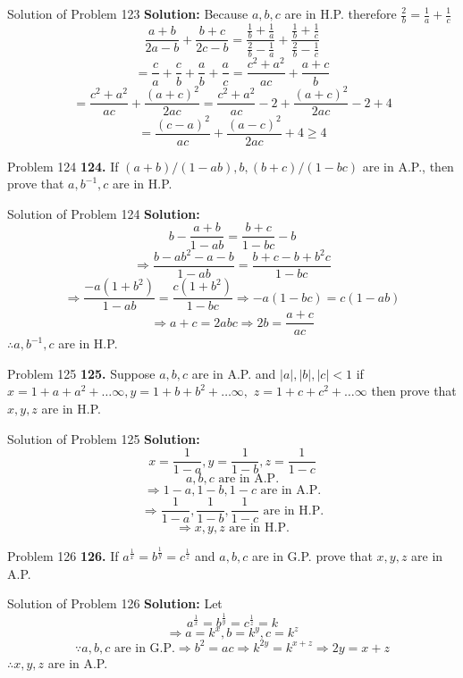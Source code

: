 \documentclass[aspectratio=1610,8pt]{beamer}
\begin{document}
\begin{frame}{Solution of Problem 123}
  \textbf{Solution:} Because $a, b, c$ are in H.P. therefore $\frac{2}{b} = \frac{1}{a} + \frac{1}{c}$
  $$\frac{a + b}{2a - b} + \frac{b + c}{2c - b} = \frac{\frac{1}{b} + \frac{1}{a}}{\frac{2}{b} - \frac{1}{a}} + \frac{\frac{1}{b} +
    \frac{1}{c}}{\frac{2}{b} - \frac{1}{c}}$$
  $$= \frac{c}{a} + \frac{c}{b} + \frac{a}{b} + \frac{a}{c} = \frac{c^2 + a^2}{ac} + \frac{a + c}{b}$$
  $$= \frac{c^2 + a^2}{ac} + \frac{(a + c)^2}{2ac} = \frac{c^2 + a^2}{ac} - 2 + \frac{(a + c)^2}{2ac} - 2 + 4$$
  $$= \frac{(c - a)^2}{ac} + \frac{(a - c)^2}{2ac} + 4 \geq 4$$
\end{frame}
\begin{frame}{Problem 124}
  \textbf{124.} If $(a + b)/(1 - ab), b, (b + c)/(1 - bc)$ are in A.P., then prove that $a, b^{-1}, c$ are in H.P.
\end{frame}
\begin{frame}{Solution of Problem 124}
  \textbf{Solution:}$$b - \frac{a + b}{1 - ab} = \frac{b + c}{1 - bc} - b$$
  $$\Rightarrow \frac{b - ab^2 - a - b}{1 - ab} = \frac{b + c - b + b^2c}{1 - bc}$$
  $$\Rightarrow \frac{-a(1 + b^2)}{1 - ab} = \frac{c(1 + b^2)}{1 - bc}\Rightarrow -a(1 - bc) = c(1 - ab)$$
  $$\Rightarrow a + c = 2abc \Rightarrow 2b = \frac{a + c}{ac}$$
  $\therefore a, b^{-1}, c$ are in H.P.
\end{frame}
\begin{frame}{Problem 125}
  \textbf{125.} Suppose $a, b, c$ are in A.P. and $|a|, |b|, |c| < 1$ if $x = 1 + a + a^2 + \ldots \infty, y = 1 + b + b^2 + \ldots
  \infty,$ $z = 1 + c + c^2 + \ldots \infty$ then prove that $x, y, z$ are in H.P.
\end{frame}
\begin{frame}{Solution of Problem 125}
  \textbf{Solution:} $$x = \frac{1}{1 - a}, y = \frac{1}{1 - b}, z = \frac{1}{1 - c}$$
  $$a, b, c\text{~are in A.P.}$$
  $$\Rightarrow 1 - a, 1 - b, 1 - c\text{~are in A.P.}$$
  $$\Rightarrow \frac{1}{1 - a}, \frac{1}{1 - b}, \frac{1}{1 - c}\text{~are in H.P.}$$
  $$\Rightarrow x, y, z\text{~are in H.P.}$$
\end{frame}
\begin{frame}{Problem 126}
  \textbf{126.} If $a^{\frac{1}{x}} = b^{\frac{1}{y}} = c^{\frac{1}{z}}$ and $a, b, c$ are in G.P. prove that $x, y, z$ are in A.P.
\end{frame}
\begin{frame}{Solution of Problem 126}
  \textbf{Solution:} Let $$a^{\frac{1}{x}} = b^{\frac{1}{y}} = c^{\frac{1}{z}} = k$$
  $$\Rightarrow a = k^x, b = k^y, c = k^z$$
  $$\because a, b, c \text{~are in G.P.} \Rightarrow b^2 = ac \Rightarrow k^{2y} = k^{x + z} \Rightarrow 2y = x + z$$
  $\therefore x, y, z$ are in A.P.
\end{frame}
\end{document}
